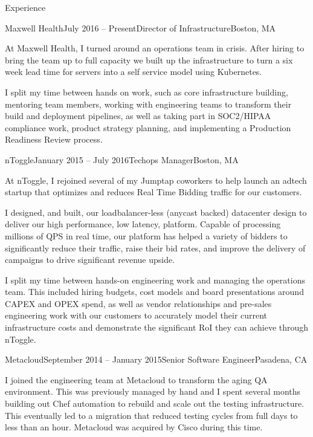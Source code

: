 \documentclass{resume} %
\begin{document}

\begin{rSection}{Experience}

\begin{rSubsection}{Maxwell Health}{July 2016 -- Present}{Director of Infrastructure}{Boston, MA}
\item[] At Maxwell Health, I turned around an operations team in crisis.  After hiring
to bring the team up to full capacity we built up the infrastructure to turn a six week
lead time for servers into a self service model using Kubernetes.

I split my time between hands on work, such as core infrastructure building,
mentoring team members, working with engineering teams to transform their
build and deployment pipelines, as well as taking part in SOC2/HIPAA compliance
work, product strategy planning, and implementing a Production Readiness Review
process.

\end{rSubsection}

\begin{rSubsection}{nToggle}{January 2015 -- July 2016}{Techops Manager}{Boston, MA}
\item[] At nToggle, I rejoined several of my Jumptap coworkers to help launch
an adtech startup that optimizes and reduces Real Time Bidding traffic for
our customers.

I designed, and built, our loadbalancer-less (anycast backed) datacenter design
to deliver our high performance, low latency, platform.  Capable of
processing millions of QPS in real time, our platform has helped a variety of
bidders to significantly reduce their traffic, raise their bid rates, and
improve the delivery of campaigns to drive significant revenue upside.  

I split my time between hands-on engineering work and managing the operations
team.  This included hiring budgets, cost models and board presentations around
CAPEX and OPEX spend, as well as vendor relationships and pre-sales engineering
work with our customers to accurately model their current infrastructure costs
and demonstrate the significant RoI they can achieve through nToggle.
\end{rSubsection}

\begin{rSubsection}{Metacloud}{September 2014 -- January 2015}{Senior Software Engineer}{Pasadena, CA}
\item[] I joined the engineering team at Metacloud to transform the aging QA environment.  This was previously managed by hand and I spent several months building out Chef automation to rebuild and scale out the testing infrastructure.  This eventually led to a migration that reduced testing cycles from full days to less than an hour.  Metacloud was acquired by Cisco during this time.
\end{rSubsection}


\end{rSection}
\end{document}
